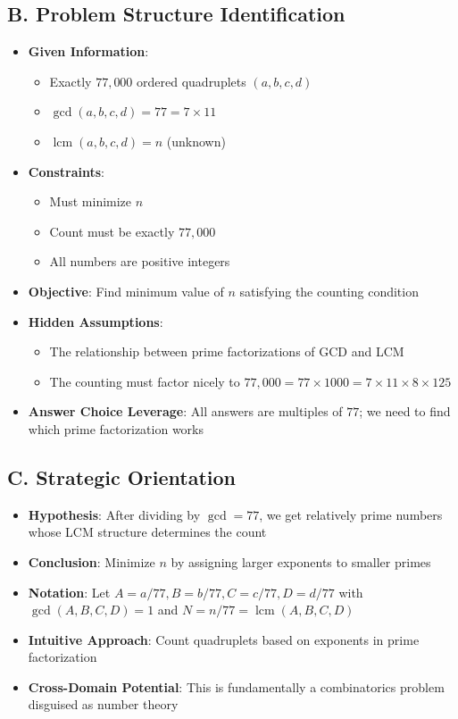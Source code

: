 \documentclass[11pt]{article}
\begin{document}
\begin{problemconfigbox}
\subsection*{B. Problem Structure Identification}
\begin{itemize}[leftmargin=*]
    \item \textbf{Given Information}: 
    \begin{itemize}
        \item Exactly $77,000$ ordered quadruplets $(a,b,c,d)$
        \item $\gcd(a,b,c,d) = 77 = 7 \times 11$
        \item $\operatorname{lcm}(a,b,c,d) = n$ (unknown)
    \end{itemize}
    \item \textbf{Constraints}: 
    \begin{itemize}
        \item Must minimize $n$
        \item Count must be exactly $77,000$
        \item All numbers are positive integers
    \end{itemize}
    \item \textbf{Objective}: Find minimum value of $n$ satisfying the counting condition
    \item \textbf{Hidden Assumptions}: 
    \begin{itemize}
        \item The relationship between prime factorizations of GCD and LCM
        \item The counting must factor nicely to $77,000 = 77 \times 1000 = 7 \times 11 \times 8 \times 125$
    \end{itemize}
    \item \textbf{Answer Choice Leverage}: All answers are multiples of $77$; we need to find which prime factorization works
\end{itemize}

\subsection*{C. Strategic Orientation}
\begin{itemize}[leftmargin=*]
    \item \textbf{Hypothesis}: After dividing by $\gcd = 77$, we get relatively prime numbers whose LCM structure determines the count
    \item \textbf{Conclusion}: Minimize $n$ by assigning larger exponents to smaller primes
    \item \textbf{Notation}: Let $A = a/77, B = b/77, C = c/77, D = d/77$ with $\gcd(A,B,C,D) = 1$ and $N = n/77 = \operatorname{lcm}(A,B,C,D)$
    \item \textbf{Intuitive Approach}: Count quadruplets based on exponents in prime factorization
    \item \textbf{Cross-Domain Potential}: This is fundamentally a combinatorics problem disguised as number theory
\end{itemize}
\end{problemconfigbox}
\end{document}
